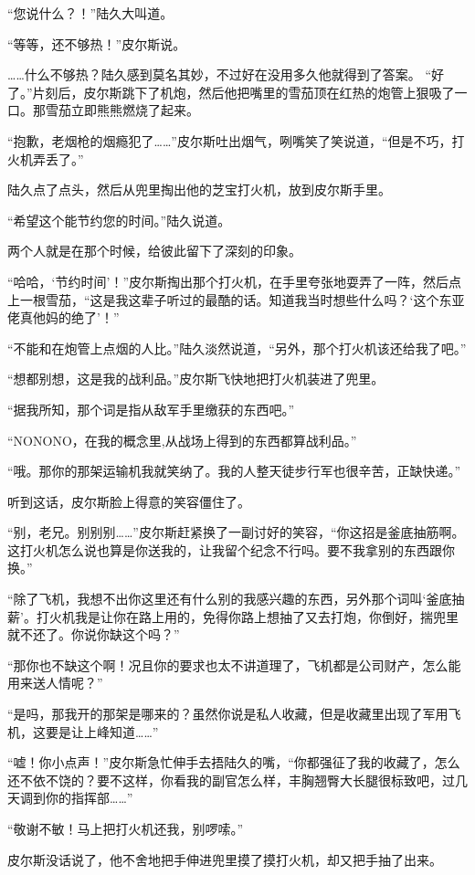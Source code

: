 “您说什么？！”陆久大叫道。

“等等，还不够热！”皮尔斯说。

……什么不够热？陆久感到莫名其妙，不过好在没用多久他就得到了答案。
“好了。”片刻后，皮尔斯跳下了机炮，然后他把嘴里的雪茄顶在红热的炮管上狠吸了一口。那雪茄立即熊熊燃烧了起来。

“抱歉，老烟枪的烟瘾犯了……”皮尔斯吐出烟气，咧嘴笑了笑说道，“但是不巧，打火机弄丢了。”

陆久点了点头，然后从兜里掏出他的芝宝打火机，放到皮尔斯手里。

“希望这个能节约您的时间。”陆久说道。

两个人就是在那个时候，给彼此留下了深刻的印象。

“哈哈，‘节约时间’！”皮尔斯掏出那个打火机，在手里夸张地耍弄了一阵，然后点上一根雪茄，“这是我这辈子听过的最酷的话。知道我当时想些什么吗？‘这个东亚佬真他妈的绝了’！”

“不能和在炮管上点烟的人比。”陆久淡然说道，“另外，那个打火机该还给我了吧。”

“想都别想，这是我的战利品。”皮尔斯飞快地把打火机装进了兜里。

“据我所知，那个词是指从敌军手里缴获的东西吧。”

“NONONO，在我的概念里,从战场上得到的东西都算战利品。”

“哦。那你的那架运输机我就笑纳了。我的人整天徒步行军也很辛苦，正缺快递。”

听到这话，皮尔斯脸上得意的笑容僵住了。

“别，老兄。别别别……”皮尔斯赶紧换了一副讨好的笑容，“你这招是釜底抽筋啊。这打火机怎么说也算是你送我的，让我留个纪念不行吗。要不我拿别的东西跟你换。”

“除了飞机，我想不出你这里还有什么别的我感兴趣的东西，另外那个词叫‘釜底抽薪’。打火机我是让你在路上用的，免得你路上想抽了又去打炮，你倒好，揣兜里就不还了。你说你缺这个吗？”

“那你也不缺这个啊！况且你的要求也太不讲道理了，飞机都是公司财产，怎么能用来送人情呢？”

“是吗，那我开的那架是哪来的？虽然你说是私人收藏，但是收藏里出现了军用飞机，这要是让上峰知道……”

“嘘！你小点声！”皮尔斯急忙伸手去捂陆久的嘴，“你都强征了我的收藏了，怎么还不依不饶的？要不这样，你看我的副官怎么样，丰胸翘臀大长腿很标致吧，过几天调到你的指挥部……”

“敬谢不敏！马上把打火机还我，别啰嗦。”

皮尔斯没话说了，他不舍地把手伸进兜里摸了摸打火机，却又把手抽了出来。


